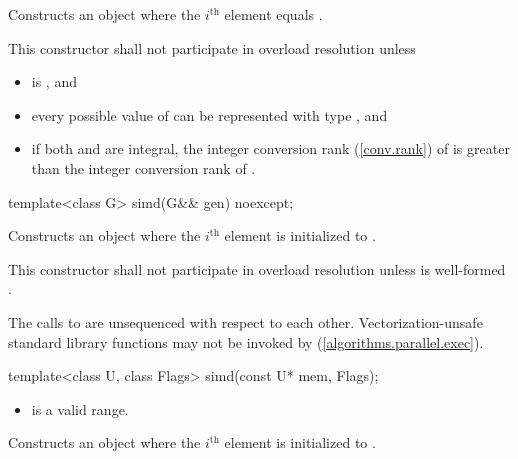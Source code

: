 \begin{wgText}
\begin{itemdescr}
  \pnum\effects
  Constructs an object where the $i^\text{th}$ element equals  \foralli.

  \pnum\remarks
  This constructor shall not participate in overload resolution unless
  \begin{itemize}
    \item {} is , and
    \item every possible value of  can be represented with type , and
    \item if both  and  are integral, the integer conversion rank (\ref{conv.rank}) of  is greater than the integer conversion rank of .
  \end{itemize}
\end{itemdescr}

\begin{itemdecl}
template<class G> simd(G&& gen) noexcept;
\end{itemdecl}

\begin{itemdescr}
  \pnum\effects
  Constructs an object where the $i^\text{th}$ element is initialized to .

  \pnum\remarks
  This constructor shall not participate in overload resolution unless  is well-formed \foralli.

  \pnum
  The calls to  are unsequenced with respect to each other. Vectorization-unsafe standard library functions may not be invoked by  (\ref{algorithms.parallel.exec}).
\end{itemdescr}

\begin{itemdecl}
template<class U, class Flags> simd(const U* mem, Flags);
\end{itemdecl}

\begin{itemdescr}
  \pnum\requires
  \begin{itemize}
    \item \tcode{[mem, mem + size())} is a valid range.
  \end{itemize}

  \pnum\effects
  Constructs an object where the $i^\text{th}$ element is initialized to  \foralli.


\end{itemdescr}
\end{wgText}

